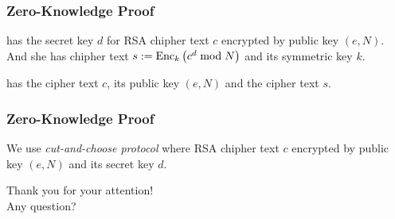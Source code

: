 \begin{frame}
  \frametitle{Zero-Knowledge Proof}


  \begin{description}
    \item<3->[Prover Alice] has the secret key $d$ for
    RSA chipher text $c$ encrypted by public key $(e, N)$.
    And she has chipher text $s := \text{Enc}_{k}\left(c^d \bmod N\right)$ and
    its symmetric key $k$.
    
    \item<4->[Verifier Bob] has the cipher text $c$,
    its public key $(e, N)$ and the cipher text $s$.
  \end{description}

\end{frame}

\newcommand{\ZZ}{\mathbb{Z}}

\begin{frame}[fragile]
  \frametitle{Zero-Knowledge Proof}

  We use \emph{cut-and-choose protocol} where
  RSA chipher text $c$ encrypted by public key $(e, N)$ and
  its secret key $d$.

\end{frame}
  
\begin{frame}
  \centering
  {\Huge Thank you for your attention!\\
    \vspace{1em}
    Any question?
  }
\end{frame}


